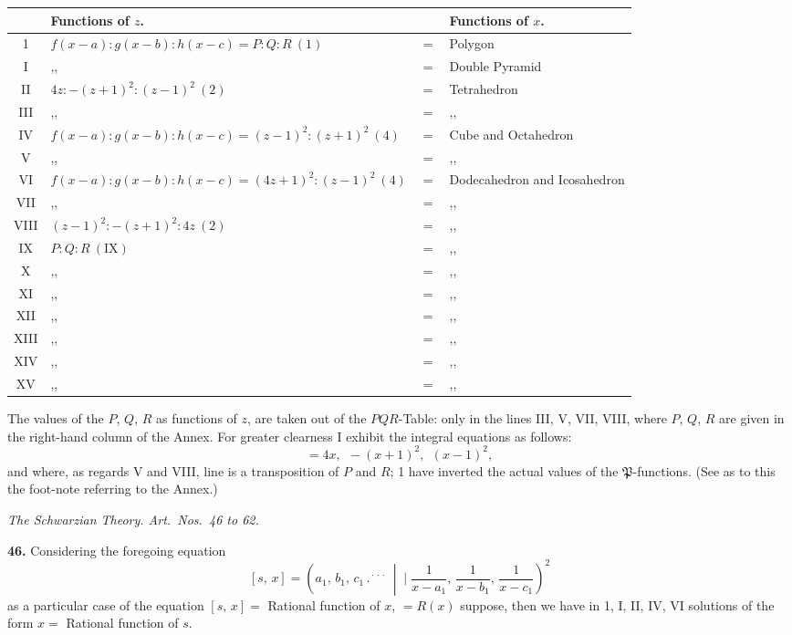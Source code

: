 \documentclass[11pt]{article}
\newcommand{\artno}[1]{\textbf{#1.}\quad}
\begin{document}
\begin{center}
\begin{tabular}{|c|l|c|l|}
\hline
& Functions of $z$. & & Functions of $x$. \\
\hline
1 & $f(x-a) : g(x-b) : h(x-c) = P : Q : R\ (1)$ & $=$ & Polygon \\
I & ,, & $=$ & Double Pyramid \\[2pt]
II & $4z : -(z+1)^{2} : (z-1)^{2}\ (2)$ & $=$ & Tetrahedron \\
III & ,, & $=$ & ,, \\[2pt]
IV & $f(x-a) : g(x-b) : h(x-c) = (z-1)^{2} : (z+1)^{2}\ (4)$ & $=$ & Cube and Octahedron \\
V & ,, & $=$ & ,, \\[2pt]
VI & $f(x-a) : g(x-b) : h(x-c) = (4z + 1)^{2} : (z-1)^{2}\ (4)$ & $=$ & Dodecahedron and Icosahedron \\
VII & ,, & $=$ & ,, \\
VIII & $(z-1)^{2} : -(z+1)^{2} : 4z\ (2)$ & $=$ & ,, \\
IX & $P : Q : R\ (\text{IX})$ & $=$ & ,, \\
X & ,, & $=$ & ,, \\
XI & ,, & $=$ & ,, \\
XII & ,, & $=$ & ,, \\
XIII & ,, & $=$ & ,, \\
XIV & ,, & $=$ & ,, \\
XV & ,, & $=$ & ,, \\
\hline
\end{tabular}
\end{center}

The values of the $P$, $Q$, $R$ as functions of $z$, are taken out of the
$PQR$-Table: only in the lines III, V, VII, VIII, where $P$, $Q$, $R$ are given in the right-hand column of the Annex. For greater clearness I exhibit the integral equations
as follows:
\[
   = 4x,\ \ -(x+1)^{2},\ \ (x-1)^{2},
\]
and where, as regards V and VIII, line is a transposition of $P$ and $R$; 1 have
inverted the actual values of the $\mathfrak{P}$-functions. (See as to this the foot-note referring
to the Annex.)

\bigskip

\begin{center}
\textit{The Schwarzian Theory. Art.\ Nos.\ 46 to 62.}
\end{center}

\medskip

\artno{46} Considering the foregoing equation
\[
   [s,\,x] = \left(a_{1},\,b_{1},\,c_{1} \,.{}^{\!\cdot\!\cdot\!\cdot}\,\middle|\!\!\!\mid \frac{1}{x-a_{1}},\,\frac{1}{x-b_{1}},\,\frac{1}{x-c_{1}}\right)^{\!2}
\]
as a particular case of the equation $[s,\,x] = $ Rational function of $x$, $= R(x)$ suppose,
then we have in 1, I, II, IV, VI solutions of the form $x = $ Rational function of $s$.
\end{document}

